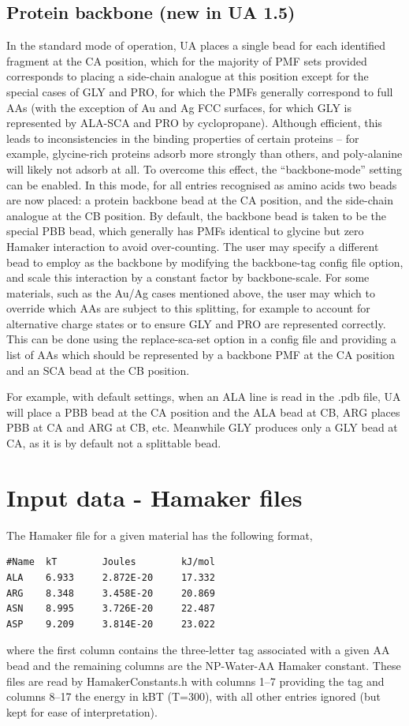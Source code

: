 \documentclass[10pt,a4paper,onecolumn]{report}
\begin{document}
\subsection{Protein backbone (new in UA 1.5)}
In the standard mode of operation, UA places a single bead for each identified fragment at the CA position, which for the majority of PMF sets provided corresponds to placing a side-chain analogue at this position except for the special cases of GLY and PRO, for which the PMFs generally correspond to full AAs (with the exception of Au and Ag FCC surfaces, for which GLY is represented by ALA-SCA and PRO by cyclopropane). Although efficient, this leads to inconsistencies in the binding properties of certain proteins -- for example, glycine-rich proteins adsorb more strongly than others, and poly-alanine will likely not adsorb at all.
To overcome this effect, the ``backbone-mode'' setting can be enabled. In this mode, for all entries recognised as amino acids two beads are now placed: a protein backbone bead at the CA position, and the side-chain analogue at the CB position. 
By default, the backbone bead is taken to be the special PBB bead, which generally has PMFs identical to glycine but zero Hamaker interaction to avoid over-counting. The user may specify a different bead to employ as the backbone by modifying the backbone-tag config file option, and scale this interaction by a constant factor by backbone-scale.
For some materials, such as the Au/Ag cases mentioned above, the user may which to override which AAs are subject to this splitting, for example to account for alternative charge states or to ensure GLY and PRO are represented correctly. This can be done using the replace-sca-set option in a config file and providing a list of AAs which should be represented by a backbone PMF at the CA position and an SCA bead at the CB position.  

For example, with default settings, when an ALA line is read in the .pdb file, UA will place a PBB bead at the CA position and the ALA bead at CB, ARG places PBB at CA and ARG at CB, etc. Meanwhile GLY produces only a GLY bead at CA, as it is by default not a splittable bead.

\section{Input data - Hamaker files}
The Hamaker file for a given material has the following format,
\begin{lstlisting}
#Name  kT        Joules        kJ/mol    
ALA    6.933     2.872E-20     17.332    
ARG    8.348     3.458E-20     20.869    
ASN    8.995     3.726E-20     22.487    
ASP    9.209     3.814E-20     23.022    
\end{lstlisting}
where the first column contains the three-letter tag associated with a given AA bead and the remaining columns are the NP-Water-AA Hamaker constant. These files are read by HamakerConstants.h with columns 1--7 providing the tag and columns 8--17 the energy in kBT (T=300), with all other entries ignored (but kept for ease of interpretation).
\end{document}
